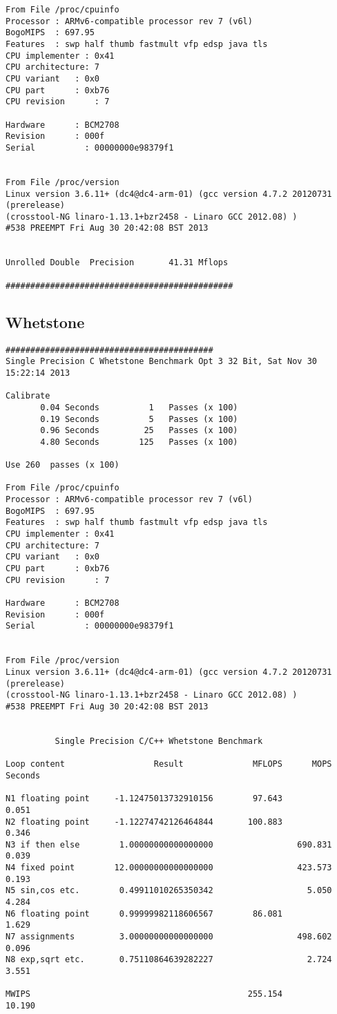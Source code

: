 \begin{verbatim}
From File /proc/cpuinfo
Processor : ARMv6-compatible processor rev 7 (v6l)
BogoMIPS  : 697.95
Features  : swp half thumb fastmult vfp edsp java tls 
CPU implementer	: 0x41
CPU architecture: 7
CPU variant	  : 0x0
CPU part	  : 0xb76
CPU revision	  : 7

Hardware	  : BCM2708
Revision	  : 000f
Serial		    : 00000000e98379f1


From File /proc/version
Linux version 3.6.11+ (dc4@dc4-arm-01) (gcc version 4.7.2 20120731 (prerelease) 
(crosstool-NG linaro-1.13.1+bzr2458 - Linaro GCC 2012.08) ) 
#538 PREEMPT Fri Aug 30 20:42:08 BST 2013


Unrolled Double  Precision       41.31 Mflops 

##############################################
\end{verbatim}

\subsection{Whetstone}\label{rpi-whetstone}

\begin{verbatim}
##########################################
Single Precision C Whetstone Benchmark Opt 3 32 Bit, Sat Nov 30 15:22:14 2013

Calibrate
       0.04 Seconds          1   Passes (x 100)
       0.19 Seconds          5   Passes (x 100)
       0.96 Seconds         25   Passes (x 100)
       4.80 Seconds        125   Passes (x 100)

Use 260  passes (x 100)

From File /proc/cpuinfo
Processor : ARMv6-compatible processor rev 7 (v6l)
BogoMIPS  : 697.95
Features  : swp half thumb fastmult vfp edsp java tls 
CPU implementer	: 0x41
CPU architecture: 7
CPU variant	  : 0x0
CPU part	  : 0xb76
CPU revision	  : 7

Hardware	  : BCM2708
Revision	  : 000f
Serial		    : 00000000e98379f1


From File /proc/version
Linux version 3.6.11+ (dc4@dc4-arm-01) (gcc version 4.7.2 20120731 (prerelease) 
(crosstool-NG linaro-1.13.1+bzr2458 - Linaro GCC 2012.08) ) 
#538 PREEMPT Fri Aug 30 20:42:08 BST 2013


          Single Precision C/C++ Whetstone Benchmark

Loop content                  Result              MFLOPS      MOPS   Seconds

N1 floating point     -1.12475013732910156        97.643              0.051
N2 floating point     -1.12274742126464844       100.883              0.346
N3 if then else        1.00000000000000000                 690.831    0.039
N4 fixed point        12.00000000000000000                 423.573    0.193
N5 sin,cos etc.        0.49911010265350342                   5.050    4.284
N6 floating point      0.99999982118606567        86.081              1.629
N7 assignments         3.00000000000000000                 498.602    0.096
N8 exp,sqrt etc.       0.75110864639282227                   2.724    3.551

MWIPS                                            255.154             10.190

\end{verbatim}

